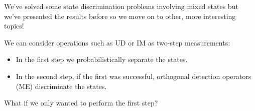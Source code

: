 \documentclass{beamer}
\begin{document}
\begin{frame}
We've solved some state discrimination problems involving mixed states but we've presented the results before so we move on to other,
more interesting topics!
\end{frame}

\begin{frame}
We can consider operations such as UD or IM as two-step measurements:
\begin{itemize}
\item
In the first step we probabilistically separate the states.  
\item
In the second step, if the first was successful, orthogonal detection operators (ME) discriminate the states.
\end{itemize}
\[\]
What if we only wanted to perform the first step? 
\end{frame}

\end{document}
